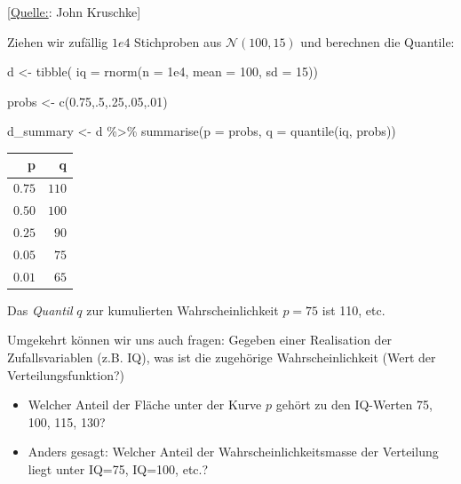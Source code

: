 \documentclass[
  a4paper,
  DIV=11]{scrreprt}
\newenvironment{Shaded}{\begin{snugshade}}{\end{snugshade}}
\newcommand{\AttributeTok}[1]{\textcolor[rgb]{0.40,0.45,0.13}{#1}}
\newcommand{\DecValTok}[1]{\textcolor[rgb]{0.68,0.00,0.00}{#1}}
\newcommand{\FloatTok}[1]{\textcolor[rgb]{0.68,0.00,0.00}{#1}}
\newcommand{\FunctionTok}[1]{\textcolor[rgb]{0.28,0.35,0.67}{#1}}
\newcommand{\NormalTok}[1]{\textcolor[rgb]{0.00,0.23,0.31}{#1}}
\newcommand{\OtherTok}[1]{\textcolor[rgb]{0.00,0.23,0.31}{#1}}
\newcommand{\SpecialCharTok}[1]{\textcolor[rgb]{0.37,0.37,0.37}{#1}}
\providecommand{\tightlist}{%
  \setlength{\itemsep}{0pt}\setlength{\parskip}{0pt}}\usepackage{longtable,booktabs,array}
\theoremstyle{definition}
\theoremstyle{remark}
\begin{document}
{[}\href{https://jkkweb.sitehost.iu.edu/KruschkeFreqAndBayesAppTutorial.html\#data_are_described_by_mathematical_models}{Quelle:}:
John Kruschke{]}

Ziehen wir zufällig \(1e4\) Stichproben aus \(\mathcal{N}(100,15)\) und
berechnen die Quantile:

\begin{Shaded}
\begin{Highlighting}[]
\NormalTok{d }\OtherTok{\textless{}{-}}
  \FunctionTok{tibble}\NormalTok{(}
  \AttributeTok{iq =} \FunctionTok{rnorm}\NormalTok{(}\AttributeTok{n =} \FloatTok{1e4}\NormalTok{, }
             \AttributeTok{mean =} \DecValTok{100}\NormalTok{, }
             \AttributeTok{sd =} \DecValTok{15}\NormalTok{))}

\NormalTok{probs }\OtherTok{\textless{}{-}} \FunctionTok{c}\NormalTok{(}\FloatTok{0.75}\NormalTok{,.}\DecValTok{5}\NormalTok{,.}\DecValTok{25}\NormalTok{,.}\DecValTok{05}\NormalTok{,.}\DecValTok{01}\NormalTok{)}

\NormalTok{d\_summary }\OtherTok{\textless{}{-}}\NormalTok{ d }\SpecialCharTok{\%\textgreater{}\%} 
  \FunctionTok{summarise}\NormalTok{(}\AttributeTok{p =}\NormalTok{ probs,}
            \AttributeTok{q =} \FunctionTok{quantile}\NormalTok{(iq, probs))}
\end{Highlighting}
\end{Shaded}

\begin{longtable}{rr}
\toprule
p & q \\ 
\midrule
$0.75$ & $110$ \\ 
$0.50$ & $100$ \\ 
$0.25$ & $90$ \\ 
$0.05$ & $75$ \\ 
$0.01$ & $65$ \\ 
\bottomrule
\end{longtable}

Das \emph{Quantil} \(q\) zur kumulierten Wahrscheinlichkeit \(p=75\) ist
110, etc.

Umgekehrt können wir uns auch fragen: Gegeben einer Realisation der
Zufallsvariablen (z.B. IQ), was ist die zugehörige Wahrscheinlichkeit
(Wert der Verteilungsfunktion?)

\begin{itemize}
\tightlist
\item
  Welcher Anteil der Fläche unter der Kurve \(p\) gehört zu den
  IQ-Werten 75, 100, 115, 130?
\item
  Anders gesagt: Welcher Anteil der Wahrscheinlichkeitsmasse der
  Verteilung liegt unter IQ=75, IQ=100, etc.?
\end{itemize}
\end{document}
